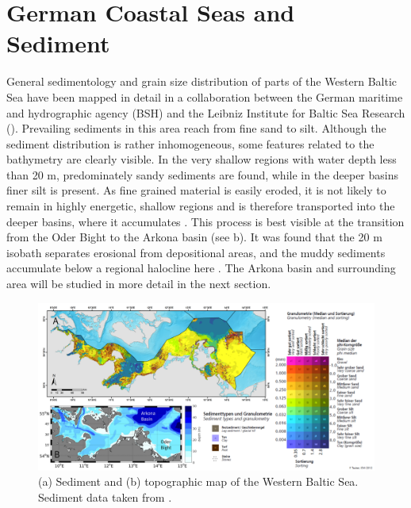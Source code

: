\section{German Coastal Seas and Sediment}

General sedimentology and grain size distribution of parts of the Western 
Baltic Sea have 
been mapped in detail in a collaboration between the German maritime and 
hydrographic agency (BSH) and the Leibniz Institute for Baltic Sea Research 
(). Prevailing sediments in this area reach from 
fine sand to silt. Although the sediment distribution is rather inhomogeneous, 
some 
features related to the bathymetry are clearly visible. In the very shallow 
regions with water depth less than 20 m, predominately sandy sediments are 
found, while in the deeper basins finer silt is present.
As fine grained material is easily eroded, it is not likely to remain in highly 
energetic, shallow regions and is therefore transported into the deeper basins, 
where 
it accumulates \citep[][]{basys1}. This process is best visible at the 
transition from the Oder Bight to the Arkona basin (see b). 
It was found that the 20 m isobath separates erosional from depositional areas, 
and the muddy sediments accumulate below a regional halocline here 
\citep[][]{basys2}. The Arkona basin and surrounding area will be studied in 
more detail in the next section.

\begin{figure}[ht]
 \flushleft
 \includegraphics[width=16cm]{bilder/sediment.pdf}
 \caption{(a) Sediment and (b) topographic map of the Western Baltic 
Sea. Sediment data taken from \citep[][]{tauber2012}.}\label{westernbaltic}
\end{figure}